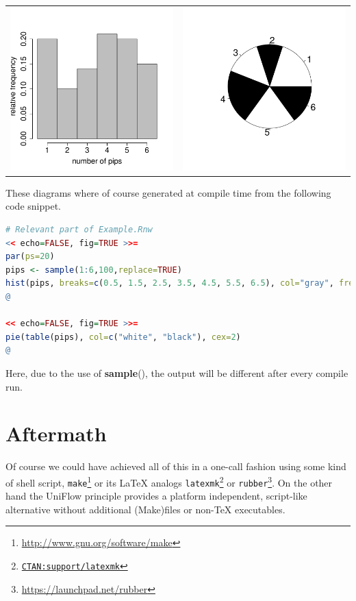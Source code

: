 \documentclass{maps}
\begin{document}
\begin{tabular}{cc}
\includegraphics[width=.4\linewidth]{arn/R-hist}
& \includegraphics[trim={90 90 60 70},clip=true,width=.4\linewidth]{arn/R-pie}
\end{tabular}

These diagrams where of course generated at compile time from the following code snippet.

\begin{lstlisting}[language=R, style=arn:lst]
# Relevant part of Example.Rnw
<< echo=FALSE, fig=TRUE >>=
par(ps=20)
pips <- sample(1:6,100,replace=TRUE)
hist(pips, breaks=c(0.5, 1.5, 2.5, 3.5, 4.5, 5.5, 6.5), col="gray", freq=FALSE, main="", xlab="number of pips", ylab="relative frequency")
@

<< echo=FALSE, fig=TRUE >>=
pie(table(pips), col=c("white", "black"), cex=2)
@
\end{lstlisting}

Here, due to the use of \textbf{sample}(), the output will be different after every compile run.



\section{Aftermath}

Of course we could have achieved all of this in a one-call fashion using some kind of shell script, \texttt{make}\footnote{\url{http://www.gnu.org/software/make}} or its \LaTeX{} analogs \texttt{latexmk}\footnote{\href{http://ctan.org/tex-archive/support/latexmk/}{\texttt{CTAN:support/latexmk}}} or \texttt{rubber}\footnote{\url{https://launchpad.net/rubber}}.
On the other hand the UniFlow principle provides a platform independent, script-like alternative without additional (Make)files or non-\TeX{} executables.
\end{document}
